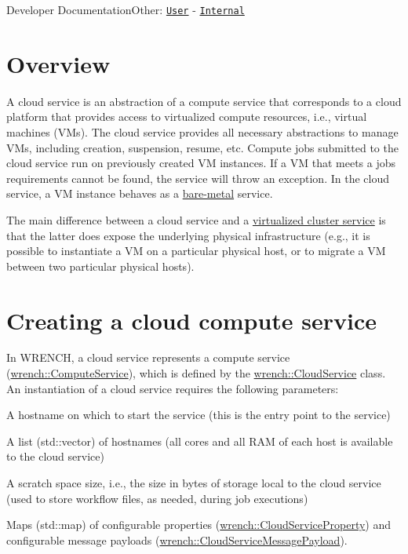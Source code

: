 Developer DocumentationOther\+: \href{../user/guide-cloud.html}{\tt User} -\/ \href{../internal/guide-cloud.html}{\tt Internal}\hypertarget{guide-cloud_guide-cloud-overview}{}\section{Overview}\label{guide-cloud_guide-cloud-overview}
A cloud service is an abstraction of a compute service that corresponds to a cloud platform that provides access to virtualized compute resources, i.\+e., virtual machines (V\+Ms). The cloud service provides all necessary abstractions to manage V\+Ms, including creation, suspension, resume, etc. Compute jobs submitted to the cloud service run on previously created VM instances. If a VM that meets a job\textquotesingle{}s requirements cannot be found, the service will throw an exception. In the cloud service, a VM instance behaves as a \hyperlink{guide-baremetal}{bare-\/metal} service.

The main difference between a cloud service and a \hyperlink{guide-virtualizedcluster}{virtualized cluster service} is that the latter does expose the underlying physical infrastructure (e.\+g., it is possible to instantiate a VM on a particular physical host, or to migrate a VM between two particular physical hosts).\hypertarget{guide-cloud_guide-cloud-creating}{}\section{Creating a cloud compute service}\label{guide-cloud_guide-cloud-creating}
In W\+R\+E\+N\+CH, a cloud service represents a compute service (\hyperlink{classwrench_1_1_compute_service}{wrench\+::\+Compute\+Service}), which is defined by the \hyperlink{classwrench_1_1_cloud_service}{wrench\+::\+Cloud\+Service} class. An instantiation of a cloud service requires the following parameters\+:


\begin{DoxyItemize}
\item A hostname on which to start the service (this is the entry point to the service)
\item A list ({\ttfamily std\+::vector}) of hostnames (all cores and all R\+AM of each host is available to the cloud service)
\item A scratch space size, i.\+e., the size in bytes of storage local to the cloud service (used to store workflow files, as needed, during job executions)
\item Maps ({\ttfamily std\+::map}) of configurable properties ({\ttfamily \hyperlink{classwrench_1_1_cloud_service_property}{wrench\+::\+Cloud\+Service\+Property}}) and configurable message payloads ({\ttfamily \hyperlink{classwrench_1_1_cloud_service_message_payload}{wrench\+::\+Cloud\+Service\+Message\+Payload}}).
\end{DoxyItemize}

